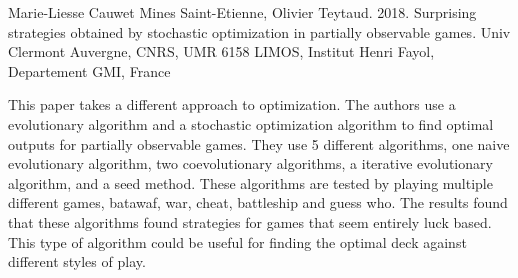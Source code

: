 \documentclass[12pt, letterpaper]{article}
\begin{document}
Marie-Liesse Cauwet Mines Saint-Etienne, Olivier Teytaud. 2018. Surprising strategies obtained by stochastic
optimization in partially observable games. Univ Clermont Auvergne, CNRS, UMR 6158 LIMOS, Institut Henri Fayol,
Departement GMI, France

This paper takes a different approach to optimization. The authors use a evolutionary algorithm and a stochastic
optimization algorithm to find optimal outputs for partially observable games. They use 5 different algorithms, one
naive evolutionary algorithm, two coevolutionary algorithms, a iterative evolutionary algorithm, and a seed method.
These algorithms are tested by playing multiple different games, batawaf, war, cheat, battleship and guess who. The
results found that these algorithms found strategies for games that seem entirely luck based. This type of algorithm
could be useful for finding the optimal deck against different styles of play.
\end{document}
